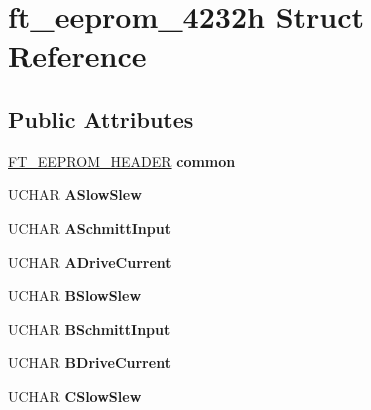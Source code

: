 \hypertarget{structft__eeprom__4232h}{}\section{ft\+\_\+eeprom\+\_\+4232h Struct Reference}
\label{structft__eeprom__4232h}
\subsection*{Public Attributes}
\begin{DoxyCompactItemize}
\item 
\mbox{\label{structft__eeprom__4232h_acfee0a972954d9a20c82fcd18b082194}} 
\hyperlink{structft__eeprom__header}{F\+T\+\_\+\+E\+E\+P\+R\+O\+M\+\_\+\+H\+E\+A\+D\+ER} {\bfseries common}
\item 
\mbox{\label{structft__eeprom__4232h_a1e66ea6b513734d830d86565441b6318}} 
U\+C\+H\+AR {\bfseries A\+Slow\+Slew}
\item 
\mbox{\label{structft__eeprom__4232h_a47fdc0898935fa1d2c60cfcf93685231}} 
U\+C\+H\+AR {\bfseries A\+Schmitt\+Input}
\item 
\mbox{\label{structft__eeprom__4232h_a67ec1ef6e8b91116d539dd304c9c6f53}} 
U\+C\+H\+AR {\bfseries A\+Drive\+Current}
\item 
\mbox{\label{structft__eeprom__4232h_acd3e611ccee7fc8be7c459e6a436efda}} 
U\+C\+H\+AR {\bfseries B\+Slow\+Slew}
\item 
\mbox{\label{structft__eeprom__4232h_a8bb143cc9d051960d4aa6fc9be3230d4}} 
U\+C\+H\+AR {\bfseries B\+Schmitt\+Input}
\item 
\mbox{\label{structft__eeprom__4232h_ac42c22b82bdca1458089ac49f0eaefa1}} 
U\+C\+H\+AR {\bfseries B\+Drive\+Current}
\item 
\mbox{\label{structft__eeprom__4232h_a6d92eb606cbe5c251751cd2d6fd8bebe}} 
U\+C\+H\+AR {\bfseries C\+Slow\+Slew}
\item 
\mbox{\label{structft__eeprom__4232h_a30fb25eb86d7e47668b6a044e6196705}} 

\end{DoxyCompactItemize}
